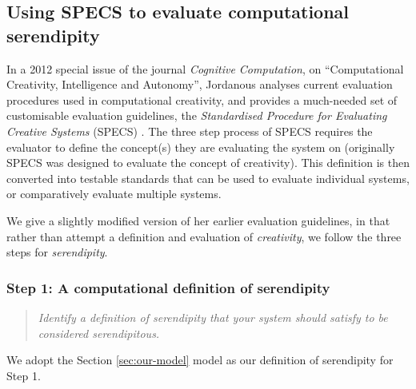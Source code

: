 \subsection{Using SPECS to evaluate computational serendipity}\label{specs-overview}

In a 2012 special issue of the journal {\em Cognitive Computation}, on
``Computational Creativity, Intelligence and Autonomy'', Jordanous
analyses current evaluation procedures used in computational
creativity, and provides a much-needed set of customisable evaluation
guidelines, the \emph{Standardised Procedure for Evaluating Creative
  Systems} (SPECS) \cite{jordanous:12}. The three step process of SPECS requires the evaluator to define the concept(s) they are evaluating the system on (originally SPECS was designed to evaluate the concept of creativity). This definition is then converted into testable standards that can be used to evaluate individual systems, or comparatively evaluate multiple systems.

We give a slightly modified version of her earlier evaluation
guidelines, in that rather than attempt a definition and evaluation of
{\em creativity}, we follow the three steps for \emph{serendipity}. 


\subsubsection*{Step 1: A computational definition of serendipity}
\begin{quote} {\em Identify a definition of serendipity that your
    system should satisfy to be considered serendipitous.}\end{quote}

\noindent We adopt the Section \ref{sec:our-model} model as our definition of serendipity for Step 1.

